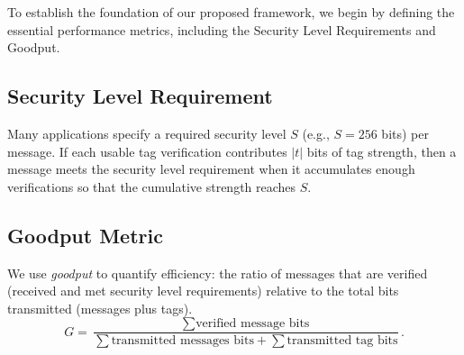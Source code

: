 To establish the foundation of our proposed framework, we begin by defining the essential performance metrics, including the Security Level Requirements and Goodput.


\subsection*{Security Level Requirement}\label{sec_lvl_req}
Many applications specify a required security level $S$ (e.g., $S=256$ bits) per message. If each usable tag verification contributes $|t|$ bits of tag strength, then a message meets the security level requirement when it accumulates enough verifications so that the cumulative strength reaches $S$.
\subsection{Goodput Metric}
We use \emph{goodput} to quantify efficiency: the ratio of messages that are verified (received and met security level requirements) relative to the total bits transmitted (messages plus tags). 
\begin{equation}
    G = \dfrac{\sum\text{verified message bits}}{\sum\text{transmitted messages bits} + \sum\text{transmitted tag bits}}.
\end{equation}

